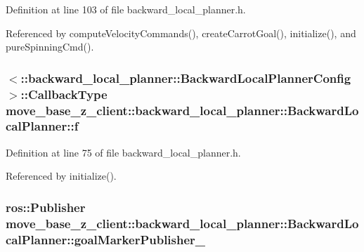 Definition at line 103 of file backward\+\_\+local\+\_\+planner.\+h.



Referenced by compute\+Velocity\+Commands(), create\+Carrot\+Goal(), initialize(), and pure\+Spinning\+Cmd().

\subsubsection[{\texorpdfstring{f}{f}}]{$<$\+::backward\+\_\+local\+\_\+planner\+::\+Backward\+Local\+Planner\+Config$>$\+::Callback\+Type move\+\_\+base\+\_\+z\+\_\+client\+::backward\+\_\+local\+\_\+planner\+::\+Backward\+Local\+Planner\+::f\hspace{0.3cm}{\ttfamily [private]}}\hypertarget{classmove__base__z__client_1_1backward__local__planner_1_1BackwardLocalPlanner_a8851653bff38ab410bda8aca0ba32574}{}\label{classmove__base__z__client_1_1backward__local__planner_1_1BackwardLocalPlanner_a8851653bff38ab410bda8aca0ba32574}


Definition at line 75 of file backward\+\_\+local\+\_\+planner.\+h.



Referenced by initialize().

\subsubsection[{\texorpdfstring{goal\+Marker\+Publisher\+\_\+}{goalMarkerPublisher_}}]{\setlength{\rightskip}{0pt plus 5cm}ros\+::\+Publisher move\+\_\+base\+\_\+z\+\_\+client\+::backward\+\_\+local\+\_\+planner\+::\+Backward\+Local\+Planner\+::goal\+Marker\+Publisher\+\_\+\hspace{0.3cm}{\ttfamily [private]}}\hypertarget{classmove__base__z__client_1_1backward__local__planner_1_1BackwardLocalPlanner_a7228d3fe90bc48b486e5c46d6ac5e815}{}\label{classmove__base__z__client_1_1backward__local__planner_1_1BackwardLocalPlanner_a7228d3fe90bc48b486e5c46d6ac5e815}



